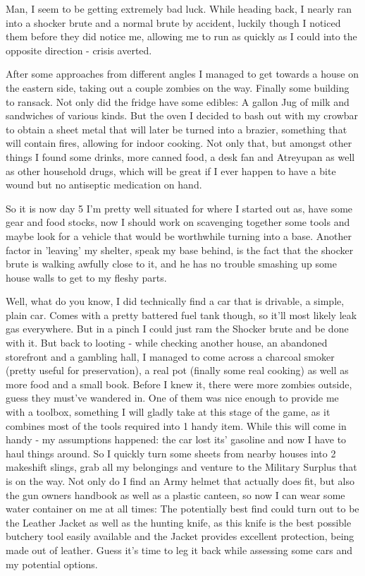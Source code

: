 \documentclass[11pt]{report}
\begin{document}
Man, I seem to be getting extremely bad luck. While heading back, I nearly ran into a shocker brute and a normal brute by accident, luckily though I noticed them before they did notice me, allowing me to run as quickly as I could into the opposite direction - crisis averted.

After some approaches from different angles I managed to get towards a house on the eastern side, taking out a couple zombies on the way. Finally some building to ransack. Not only did the fridge have some edibles: A gallon Jug of milk and sandwiches of various kinds. But the oven I decided to bash out with my crowbar to obtain a sheet metal that will later be turned into a brazier, something that will contain fires, allowing for indoor cooking. Not only that, but amongst other things I found some drinks, more canned food, a desk fan and Atreyupan as well as other household drugs, which will be great if I ever happen to have a bite wound but no antiseptic medication on hand.

So it is now day 5
I'm pretty well situated for where I started out as, have some gear and food stocks, now I should work on scavenging together some tools and maybe look for a vehicle that would be worthwhile turning into a base.
Another factor in 'leaving' my shelter, speak my base behind, is the fact that the shocker brute is walking awfully close to it, and he has no trouble smashing up some house walls to get to my fleshy parts.

Well, what do you know, I did technically find a car that is drivable, a simple, plain car. Comes with a pretty battered fuel tank though, so it'll most likely leak gas everywhere. But in a pinch I could just ram the Shocker brute and be done with it.
But back to looting - while checking another house, an abandoned storefront and a gambling hall, I managed to come across a charcoal smoker (pretty useful for preservation), a real pot (finally some real cooking) as well as more food and a small book. Before I knew it, there were more zombies outside, guess they must've wandered in. One of them was nice enough to provide me with a toolbox, something I will gladly take at this stage of the game, as it combines most of the tools required into 1 handy item.
While this will come in handy - my assumptions happened: the car lost its' gasoline and now I have to haul things around. So I quickly turn some sheets from nearby houses into 2 makeshift slings, grab all my belongings and venture to the Military Surplus that is on the way. Not only do I find an Army helmet that actually does fit, but also the gun owners handbook as well as a plastic canteen, so now I can wear some water container on me at all times: The potentially best find could turn out to be the Leather Jacket as well as the hunting knife, as this knife is the best possible butchery tool easily available and the Jacket provides excellent protection, being made out of leather. Guess it's time to leg it back while assessing some cars and my potential options.
\end{document}
